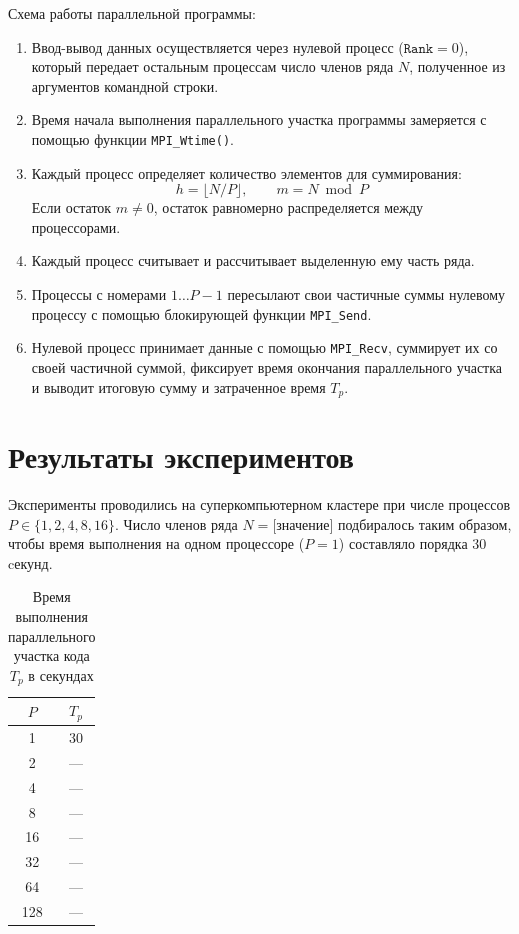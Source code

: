 	Схема работы параллельной программы:
	\begin{enumerate}
		\item Ввод-вывод данных осуществляется через нулевой процесс ($\texttt{Rank} = 0$), который передает остальным процессам число членов ряда $N$, полученное из аргументов командной строки.
		\item Время начала выполнения параллельного участка программы замеряется с помощью функции \texttt{MPI\_Wtime()}.
		\item Каждый процесс определяет количество элементов для суммирования:
		\[
		h = \lfloor N / P \rfloor, \qquad m = N \bmod P
		\]
		Если остаток $m \neq 0$, остаток равномерно распределяется между процессорами.
		\item Каждый процесс считывает и рассчитывает выделенную ему часть ряда.
		\item Процессы с номерами $1 \dots P-1$ пересылают свои частичные суммы нулевому процессу с помощью блокирующей функции \texttt{MPI\_Send}.
		\item Нулевой процесс принимает данные с помощью \texttt{MPI\_Recv}, суммирует их со своей частичной суммой, фиксирует время окончания параллельного участка и выводит итоговую сумму и затраченное время $T_p$.
	\end{enumerate}
	
	\section{Результаты экспериментов}
	Эксперименты проводились на суперкомпьютерном кластере при числе процессов $P \in \{1, 2, 4, 8, 16\}$. Число членов ряда $N = \text{[значение]}$ подбиралось таким образом, чтобы время выполнения на одном процессоре ($P=1$) составляло порядка 30 cекунд.
	
	\begin{table}[H]
		\centering
		\begin{tabular}{|c|c|}
			\hline
			$P$ & $T_p$ \\ \hline
			1   & 30  \\ \hline
			2   & --- \\ \hline
			4   & --- \\ \hline
			8   & --- \\ \hline
			16  & --- \\ \hline
			32  & --- \\ \hline
			64  & --- \\ \hline
			128 & --- \\ \hline
		\end{tabular}
		\caption{Время выполнения параллельного участка кода $T_p$ в секундах}
		\label{tab:time}
	\end{table}
	
